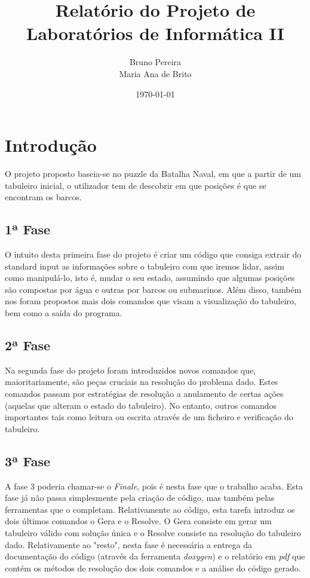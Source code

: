 \documentclass[a4paper,12pt,portuges]{article}
\title{Relatório do Projeto de Laboratórios de Informática II}
\author{Bruno Pereira \\ Maria Ana de Brito}
\date{\today}
\begin{document}
\maketitle{}


\newpage



\section{Introdução}

O projeto proposto baseia-se no puzzle da Batalha Naval, em que a partir de um tabuleiro inicial, o utilizador tem de descobrir em que posições é que se encontram os barcos.

\subsection{1ª Fase}

O intuito desta primeira fase do projeto é criar um código que consiga extrair do standard input as informações sobre o tabuleiro com que iremos lidar, assim como manipulá-lo, isto é, mudar o seu estado, assumindo que algumas posições são compostas por água e outras por barcos ou submarinos. Além disso, também nos foram propostos mais dois comandos que visam a visualização do tabuleiro, bem como a saída do programa.

\subsection{2ª Fase}

Na segunda fase do projeto foram introduzidos novos comandos que, maioritariamente, são peças cruciais na resolução do problema dado.
Estes comandos passam por estratégias de resolução a anulamento de certas ações (aquelas que alteram o estado do tabuleiro). No entanto, outros comandos importantes tais como leitura ou escrita através de um ficheiro e verificação do tabuleiro.
 
\subsection{3ª Fase}

A fase 3 poderia chamar-se o \textit{Finale}, pois é nesta fase que o trabalho acaba. Esta fase já não passa simplesmente pela criação de código, mas também pelas ferramentas que o completam.
Relativamente ao código, esta tarefa introduz os dois últimos comandos o Gera e o Resolve. O Gera consiste em gerar um tabuleiro válido com solução única e o Resolve consiste na resolução do tabuleiro dado.
Relativamente ao "resto", nesta fase é necessária a entrega da documentação do código (através da ferramenta \textit{doxygen}) e o relatório em \textit{pdf} que contém os métodos de resolução dos dois comandos e a análise do código gerado.
\end{document}

